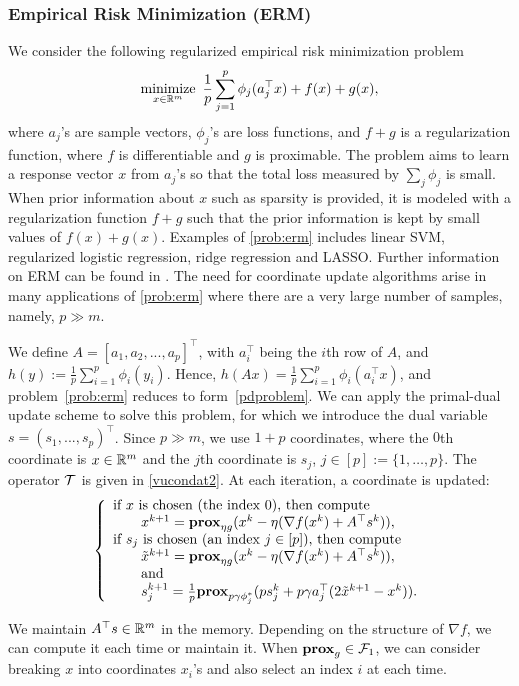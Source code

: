 \subsubsection{Empirical Risk Minimization (ERM)}
We consider the following regularized empirical risk minimization problem
\begin{equation}\label{prob:erm}
\Min_{x\in\RR^m}~ \frac{1}{p}\sum_{j=1}^p\phi_j(a_j^\top x)+f(x)+g(x),
\end{equation}
where $a_j$'s are sample vectors, $\phi_j$'s are loss functions, and $f+g$ is a regularization function, where $f$ is differentiable and $g$ is proximable. The problem aims to learn a response vector $x$ from $a_j$'s so that the total loss measured by $\sum_j \phi_j$ is small. When prior information about $x$ such as sparsity is provided, it is modeled with a regularization function $f+g$ such that the prior information is kept by small values of $f(x)+g(x)$. Examples of \ref{prob:erm} includes linear SVM, regularized logistic regression, ridge regression and LASSO. Further information on ERM can be found in \cite{hastie2005elements}. The need for coordinate update algorithms arise in many applications of \eqref{prob:erm} where there are a very large number of samples, namely, $p\gg m$. 

We define $A=[a_1,a_2,...,a_p]^\top$, with $a_i^{\top}$ being the $i$th row of $A$, and $h(y):=\frac{1}{p}\sum_{i=1}^p\phi_i(y_i)$. Hence, $h(Ax)=\frac{1}{p}\sum_{i=1}^p\phi_i(a_i^\top x)$, and problem~\eqref{prob:erm} reduces to form~\eqref{pdproblem}.
We can apply the primal-dual update scheme to solve this problem, for which we introduce the dual variable $s = (s_1, ..., s_p)^\top$. Since $p\gg m$, we use $1+p$ coordinates, where the $0$th coordinate is $x\in\mathbb{R}^m$ and the $j$th coordinate is $s_j$, $j\in [p] := \{1,\ldots,p\}$. The operator ${\mathcal{T}}$ is given in \eqref{vucondat2}. At each iteration, a coordinate is updated:
\begin{equation}
{\left\{
\begin{array}{l}
\text{if }x\text{ is chosen (the index 0), then compute}\\
\qquad {x}^{k+1}=\prox_{\eta g}(x^k-\eta(\nabla f(x^k)+A^\top s^k)),\\
\text{if }s_j\text{ is chosen (an index $j \in [p]$), then compute}\\
\qquad\tilde{x}^{k+1}=\prox_{\eta g}(x^k-\eta(\nabla f(x^k)+A^\top s^k)),\\
\qquad\text{and}\\
\qquad{s}_j^{k+1}=\frac{1}{p}\prox_{p\gamma \phi_j^*} (ps_j^k+p\gamma a_j^\top(2\tilde{x}^{k+1}-x^k)).
\end{array}
\right.
}\end{equation}

We maintain $A^\top s\in \mathbb{R}^m$ in the memory. Depending on the structure of $\nabla f$, we can compute it each time or maintain it. When $\mathbf{prox}_g\in{\mathcal{F}}_1$, we can consider breaking $x$ into coordinates $x_i$'s and also select an index $i$ at each time.
